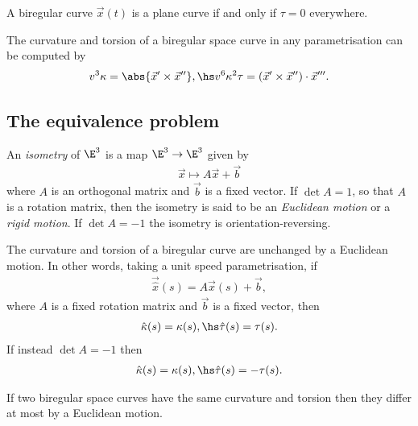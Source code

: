 \documentclass{article}
\begin{document}
\begin{theorem}
    A biregular curve $\vec x(t)$ is a plane curve if and only if $\tau=0$ everywhere.
\end{theorem}

\begin{theorem}
    The curvature and torsion of a biregular space curve in any parametrisation can be
    computed by
    \begin{align*}
        v^3\kappa = \abs{\vec x' \times \vec x''},\hs
        v^6\kappa^2\tau = (\vec x' \times \vec x'') \cdot \vec x'''.
    \end{align*}
\end{theorem}

\subsection{The equivalence problem}

\begin{definition}
    An \emph{isometry} of $\E^3$ is a map $\E^3\to\E^3$ given by
    \begin{align*}
        \vec x \mapsto A\vec x + \vec b
    \end{align*}
    where $A$ is an orthogonal matrix and $\vec b$ is a fixed vector. If $\det A = 1$,
    so that $A$ is a rotation matrix, then the isometry is said to be an \emph{Euclidean motion}
    or a \emph{rigid motion}. If $\det A = -1$ the isometry is orientation-reversing.
\end{definition}

\begin{proposition}
    The curvature and torsion of a biregular curve are unchanged by a Euclidean motion.
    In other words, taking a unit speed parametrisation, if
    \begin{align*}
        \vec{\hat x}(s) = A\vec x(s) + \vec b,
    \end{align*}
    where $A$ is a fixed rotation matrix and $\vec b$ is a fixed vector, then
    \begin{align*}
        \hat\kappa(s) = \kappa(s), \hs \hat\tau(s)=\tau(s).
    \end{align*}
    If instead $\det A=-1$ then
    \begin{align*}
        \hat\kappa(s)=\kappa(s), \hs \hat\tau(s) = -\tau(s).
    \end{align*}
\end{proposition}

\begin{theorem}
    If two biregular space curves have the same curvature and torsion then they differ at most
    by a Euclidean motion.
\end{theorem}
\end{document}
